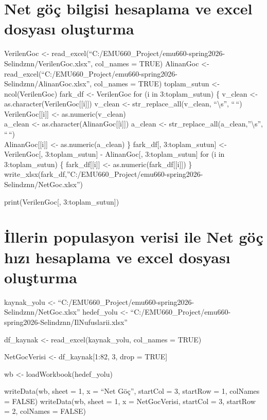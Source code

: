 \documentclass[
  11pt,
  a4paper,
  DIV=11,
  numbers=noendperiod]{scrartcl}
\begin{document}
\section{Net göç bilgisi hesaplama ve excel dosyası
oluşturma}\label{net-guxf6uxe7-bilgisi-hesaplama-ve-excel-dosyasux131-oluux15fturma}

VerilenGoc \textless-
read\_excel(``C:/EMU660\_Project/emu660-spring2026-Selindznn/VerilenGoc.xlsx'',
col\_names = TRUE) AlinanGoc \textless-
read\_excel(``C:/EMU660\_Project/emu660-spring2026-Selindznn/AlinanGoc.xlsx'',
col\_names = TRUE) toplam\_sutun \textless- ncol(VerilenGoc) fark\_df
\textless- VerilenGoc for (i in 3:toplam\_sutun) \{ v\_clean \textless-
as.character(VerilenGoc{[}{[}i{]}{]}) v\_clean \textless-
str\_replace\_all(v\_clean, ``\textbackslash s'', ``\,``)
VerilenGoc{[}{[}i{]}{]} \textless- as.numeric(v\_clean)\\
a\_clean \textless- as.character(AlinanGoc{[}{[}i{]}{]}) a\_clean
\textless- str\_replace\_all(a\_clean,''\textbackslash s'', ``\,``)\\
AlinanGoc{[}{[}i{]}{]} \textless- as.numeric(a\_clean) \} fark\_df{[},
3:toplam\_sutun{]} \textless- VerilenGoc{[}, 3:toplam\_sutun{]} -
AlinanGoc{[}, 3:toplam\_sutun{]} for (i in 3:toplam\_sutun) \{
fark\_df{[}{[}i{]}{]} \textless- as.numeric(fark\_df{[}{[}i{]}{]}) \}
write\_xlsx(fark\_df,''C:/EMU660\_Project/emu660-spring2026-Selindznn/NetGoc.xlsx'')

print(VerilenGoc{[}, 3:toplam\_sutun{]})

\section{İllerin populasyon verisi ile Net göç hızı hesaplama ve excel
dosyası
oluşturma}\label{illerin-populasyon-verisi-ile-net-guxf6uxe7-hux131zux131-hesaplama-ve-excel-dosyasux131-oluux15fturma}

kaynak\_yolu \textless-
``C:/EMU660\_Project/emu660-spring2026-Selindznn/NetGoc.xlsx''
hedef\_yolu \textless-
``C:/EMU660\_Project/emu660-spring2026-Selindznn/IlNufuslarii.xlsx''

df\_kaynak \textless- read\_excel(kaynak\_yolu, col\_names = TRUE)

NetGocVerisi \textless- df\_kaynak{[}1:82, 3, drop = TRUE{]}

wb \textless- loadWorkbook(hedef\_yolu)

writeData(wb, sheet = 1, x = ``Net Göç'', startCol = 3, startRow = 1,
colNames = FALSE) writeData(wb, sheet = 1, x = NetGocVerisi, startCol =
3, startRow = 2, colNames = FALSE)
\end{document}
